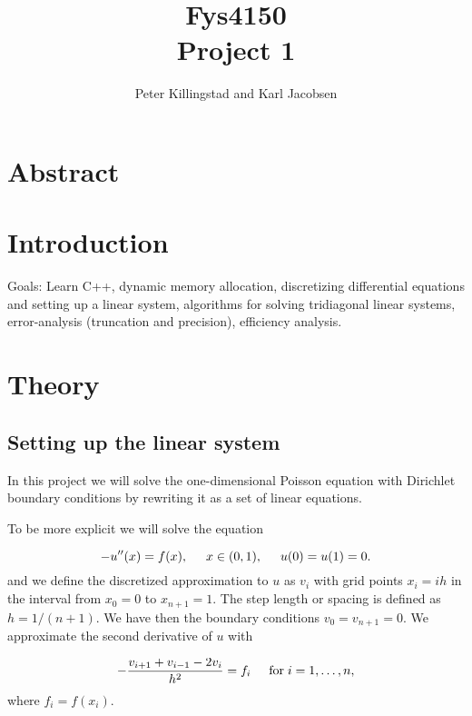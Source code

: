 \documentclass{article}
\title{Fys4150\\Project 1\\ }
\author{Peter Killingstad and Karl Jacobsen}
\begin{document}
	
\maketitle

\tableofcontents

\pagebreak
\section{Abstract}

\section{Introduction}
Goals: Learn C++, dynamic memory allocation, discretizing differential equations and setting up a linear system, algorithms for solving tridiagonal linear systems, error-analysis (truncation and precision), efficiency analysis.

\section{Theory}


\subsection{Setting up the linear system}
In this project we will solve the one-dimensional Poisson equation
with Dirichlet boundary conditions by rewriting it as a set of linear equations.


To be more explicit we will solve the equation

\begin{equation*}
-u''(x) = f(x), \hspace{0.5cm} x\in(0,1), \hspace{0.5cm} u(0) = u(1) = 0.
\end{equation*}
and we define the discretized approximation  to $u$ as $v_i$  with 
grid points $x_i=ih$   in the interval from $x_0=0$ to $x_{n+1}=1$.
The step length or spacing is defined as $h=1/(n+1)$. 
We have then the boundary conditions $v_0 = v_{n+1} = 0$.
We  approximate the second
derivative of $u$ with

\begin{equation*}
-\frac{v_{i+1}+v_{i-1}-2v_i}{h^2} = f_i  \hspace{0.5cm} \mathrm{for} \hspace{0.1cm} i=1,\dots, n,
\end{equation*}
where $f_i=f(x_i)$. \\
\end{document}
